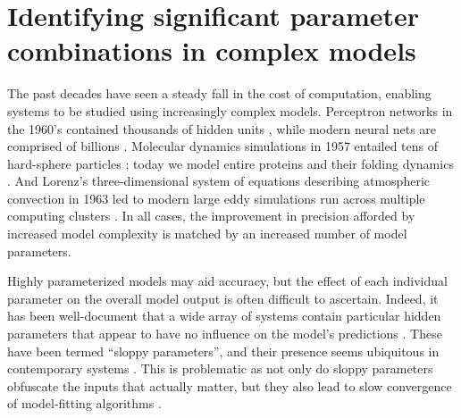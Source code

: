 \chapter{Identifying significant parameter combinations in complex
  models \label{ch:params}}




The past decades have seen a steady fall in the cost of computation,
enabling systems to be studied using increasingly complex models.
Perceptron networks in the 1960's contained thousands of hidden units
\cite{nagy_neural_1991}, while modern neural nets are comprised of
billions \cite{hsu_biggest_2015}. Molecular dynamics simulations in
1957 entailed tens of hard-sphere particles \cite{alder_phase_1957};
today we model entire proteins and their folding dynamics
\cite{piana_atomic-level_2013}. And Lorenz's three-dimensional system
of equations describing atmospheric convection in 1963
\cite{lorenz_deterministic_1963} led to modern large eddy simulations
run across multiple computing clusters \cite{ghosal_dynamic_1995}. In
all cases, the improvement in precision afforded by increased model
complexity is matched by an increased number of model parameters.

Highly parameterized models may aid accuracy, but the effect of each
individual parameter on the overall model output is often difficult to
ascertain. Indeed, it has been well-document that a wide array of
systems contain particular hidden parameters that appear to have no
influence on the model's predictions
\cite{gutenkunst_extracting_2007}. These have been termed ``sloppy
parameters'', and their presence seems ubiquitous in contemporary
systems \cite{gutenkunst_universally_2007}. This is problematic as not
only do sloppy parameters obfuscate the inputs that actually
matter, but they also lead to slow convergence of model-fitting
algorithms \cite{transtrum_geometry_2011}.


